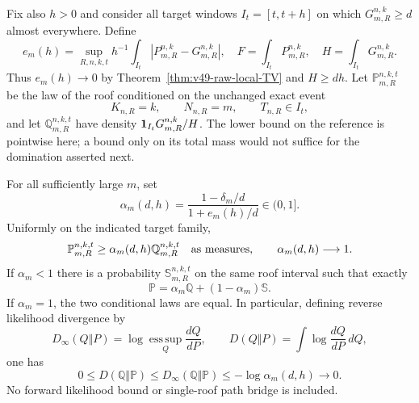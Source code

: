 Fix also $h>0$ and consider all target windows $I_t=[t,t+h]$ on
which $G_{m,R}^{n,k}\ge d$ almost everywhere. Define
\[
 e_m(h)=\sup_{R,n,k,t}h^{-1}\int_{I_t}|P_{m,R}^{n,k}-G_{m,R}^{n,k}|,
 \quad F=\int_{I_t}P_{m,R}^{n,k},\quad H=\int_{I_t}G_{m,R}^{n,k}.
\]
Thus $e_m(h)\to0$ by Theorem~\ref{thm:v49-raw-local-TV} and
$H\ge dh$. Let $\mathbb P_{m,R}^{n,k,t}$ be the law of the roof
conditioned on the unchanged exact event
\[
 K_{n,R}=k,\qquad N_{n,R}=m,\qquad T_{n,R}\in I_t,
\]
and let $\mathbb Q_{m,R}^{n,k,t}$ have density
$\mathbf1_{I_t}G_{m,R}^{n,k}/H$. The lower bound on the reference is
pointwise here; a bound only on its total mass would not suffice for
the domination asserted next.

\begin{theorem}
\label{thm:v51-conditional-minorization}
For all sufficiently large $m$, set
\begin{equation}\label{eq:v51-minorization-factor}
 \alpha_m(d,h)=\frac{1-\delta_m/d}{1+e_m(h)/d}\in(0,1].
\end{equation}
Uniformly on the indicated target family,
\begin{equation}\label{eq:v51-conditional-minorization}
 \mathbb P_{m,R}^{n,k,t}\ge
                   \alpha_m(d,h)\mathbb Q_{m,R}^{n,k,t}
                       \quad\hbox{as measures},\qquad
 \alpha_m(d,h)\longrightarrow1.
\end{equation}
If $\alpha_m<1$ there is a probability $\mathbb S_{m,R}^{n,k,t}$
on the same roof interval such that exactly
\begin{equation}\label{eq:v51-conditional-mixture}
 \mathbb P=\alpha_m\mathbb Q+(1-\alpha_m)\mathbb S.
\end{equation}
If $\alpha_m=1$, the two conditional laws are equal.
In particular, defining reverse likelihood divergence by
\[
 D_\infty(Q\Vert P)=\log\operatorname*{ess\,sup}_{Q}\frac{dQ}{dP},
 \qquad
 D(Q\Vert P)=\int\log\frac{dQ}{dP}\,dQ,
\]
one has
\begin{equation}\label{eq:v51-reverse-likelihood}
 0\le D(\mathbb Q\Vert\mathbb P)
 \le D_\infty(\mathbb Q\Vert\mathbb P)
 \le-\log\alpha_m(d,h)\longrightarrow0.
\end{equation}
No forward likelihood bound or single-roof path bridge is included.
\end{theorem}

